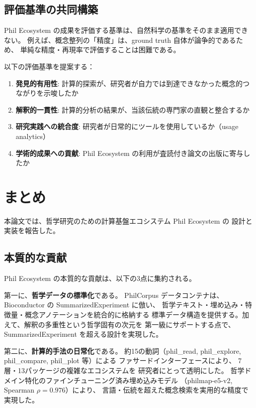 \documentclass[a4paper,11pt]{ltjsarticle}
\begin{document}
\subsection{評価基準の共同構築}

Phil Ecosystem の成果を評価する基準は、自然科学の基準をそのまま適用できない。
例えば、概念整列の「精度」は、ground truth 自体が論争的であるため、
単純な精度・再現率で評価することは困難である。

以下の評価基準を提案する：

\begin{enumerate}[leftmargin=2em]
  \item \textbf{発見的有用性}: 計算的探索が、研究者が自力では到達できなかった概念的つながりを示唆したか
  \item \textbf{解釈的一貫性}: 計算的分析の結果が、当該伝統の専門家の直観と整合するか
  \item \textbf{研究実践への統合度}: 研究者が日常的にツールを使用しているか（usage analytics）
  \item \textbf{学術的成果への貢献}: Phil Ecosystem の利用が査読付き論文の出版に寄与したか
\end{enumerate}


\section{まとめ}\label{sec:conclusion}

本論文では、哲学研究のための計算基盤エコシステム Phil Ecosystem の
設計と実装を報告した。

\subsection{本質的な貢献}

Phil Ecosystem の本質的な貢献は、以下の3点に集約される。

第一に、\textbf{哲学データの標準化}である。
PhilCorpus データコンテナは、Bioconductor の SummarizedExperiment に倣い、
哲学テキスト・埋め込み・特徴量・概念アノテーションを統合的に格納する
標準データ構造を提供する。加えて、解釈の多重性という哲学固有の次元を
第一級にサポートする点で、SummarizedExperiment を超える設計を実現した。

第二に、\textbf{計算的手法の日常化}である。
約15の動詞（phil\_read, phil\_explore, phil\_compare, phil\_plot 等）による
ファサードインターフェースにより、
7層・13パッケージの複雑なエコシステムを
研究者にとって透明にした。
哲学ドメイン特化のファインチューニング済み埋め込みモデル
（philmap-e5-v2, Spearman $\rho = 0.976$）により、
言語・伝統を超えた概念検索を実用的な精度で実現した。
\end{document}
